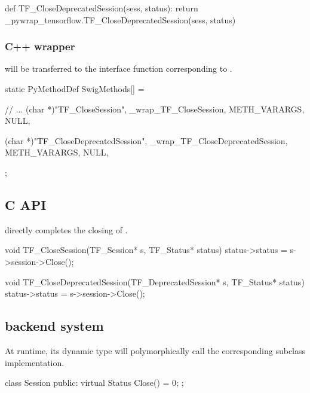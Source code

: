 \begin{content}
\begin{leftbar}
\begin{python}[caption={tensorflow/bazel-bin/tensorflow/python/pywrap\_tensorflow\_internal.py}]
def TF_CloseDeprecatedSession(sess, status):
  return _pywrap_tensorflow.TF_CloseDeprecatedSession(sess, status)
\end{python}
\end{leftbar}

\subsubsection{C++ wrapper}

 will be transferred to the  interface function corresponding to .

\begin{leftbar}
\begin{c++}[caption={tensorflow/bazel-bin/tensorflow/python/pywrap\_tensorflow\_internal.cc}]
static PyMethodDef SwigMethods[] = {
  // ...
  { (char *)"TF_CloseSession", 
    _wrap_TF_CloseSession, METH_VARARGS, NULL},

  { (char *)"TF_CloseDeprecatedSession", 
    _wrap_TF_CloseDeprecatedSession, METH_VARARGS, NULL},
};
\end{c++}
\end{leftbar}

\subsection{C API}

 directly completes the closing of .

\begin{leftbar}
\begin{c++}[caption={tensorflow/c/c\_api.c}]
void TF_CloseSession(TF_Session* s, TF_Status* status) {
  status->status = s->session->Close();
}

void TF_CloseDeprecatedSession(TF_DeprecatedSession* s, TF_Status* status) {
  status->status = s->session->Close();
}
\end{c++}
\end{leftbar}

\subsection{backend system}

 At runtime, its dynamic type will polymorphically call the corresponding subclass implementation.

\begin{leftbar}
\begin{c++}[caption={tensorflow/core/common\_runtime/session.h}]
class Session {
public:
  virtual Status Close() = 0;
};
\end{c++}
\end{leftbar}

\end{content}

